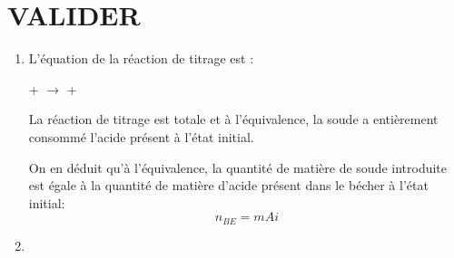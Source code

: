 \documentclass[a4paper,10pt]{article}
\begin{document}
\section{VALIDER}
\begin{enumerate}
    \item L'équation de la réaction de titrage est :
    \begin{center}
        + $\longrightarrow$  + 
    \end{center}
    La réaction de titrage est totale et à l'équivalence, la soude a entièrement consommé l'acide présent à l'état initial.
    
    On en déduit qu'à l'équivalence, la quantité de matière de soude introduite est égale à la quantité de matière d'acide présent dans le bécher à l'état initial:
    \[
        n_{BE}=m{Ai}
    \]
    \item 
\end{enumerate}
\end{document}

